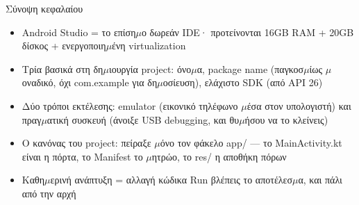 \begin{tcbsummary}{Σύνοψη κεφαλαίου}
\begin{itemize}
  \item Android Studio = το επίση$\mu$ο δωρεάν IDE· προτείνονται 16GB RAM + 20GB δίσκος + ενεργοποιη$\mu$ένη virtualization
  \item Τρία βασικά στη δη$\mu$ιουργία project: όνο$\mu$α, package name (παγκοσ$\mu$ίως $\mu$οναδικό, όχι com.example για δη$\mu$οσίευση), ελάχιστο SDK (από API 26)
  \item Δύο τρόποι εκτέλεσης: emulator (εικονικό τηλέφωνο $\mu$έσα στον υπολογιστή) και πραγ$\mu$ατική συσκευή (άνοιξε USB debugging, και θυ$\mu$ήσου να το κλείνεις)
  \item Ο κανόνας του project: πείραξε $\mu$όνο τον φάκελο app/ — το MainActivity.kt είναι η πόρτα, το Manifest το $\mu$ητρώο, το res/ η αποθήκη πόρων
  \item Καθη$\mu$ερινή ανάπτυξη = αλλαγή κώδικα Run βλέπεις το αποτέλεσ$\mu$α, και πάλι από την αρχή
\end{itemize}

\end{tcbsummary}
